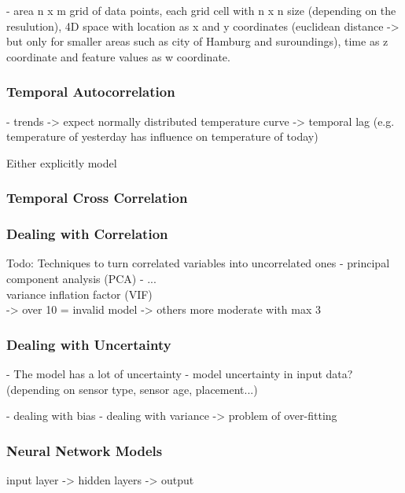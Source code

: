 - area n x m grid of data points, each grid cell with n x n size (depending on the resulution), 4D space with location as x and y coordinates (euclidean distance -> but only for smaller areas such as city of Hamburg and suroundings), time as z coordinate and feature values as w coordinate.\\

\subsubsection{Temporal Autocorrelation}

- trends
-> expect normally distributed temperature curve
-> temporal lag (e.g. temperature of yesterday has influence on temperature of today)

Either explicitly model 

\subsubsection{Temporal Cross Correlation}

\subsubsection{Dealing with Correlation}
\label{subsec:Dealing with Correlation}

Todo: Techniques to turn correlated variables into uncorrelated ones
- principal component analysis (PCA)
- ...\\

variance inflation factor (VIF)\\
-> over 10 = invalid model\cite{montgomery2021introduction}
-> others more moderate with max 3 \cite{zuur2010protocol}

\subsubsection{Dealing with Uncertainty}
- The model has a lot of uncertainty
- model uncertainty in input data? (depending on sensor type, sensor age, placement...)

- dealing with bias
- dealing with variance
-> problem of over-fitting

\subsubsection{Neural Network Models}
input layer -> hidden layers -> output

